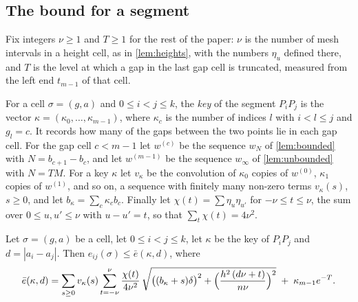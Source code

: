 \subsection{The bound for a segment}\label{sec:segment}

Fix integers $\nu\ge1$ and $T\ge1$ for the rest of the paper: $\nu$ is the number of mesh intervals in a height cell, as in \cref{lem:heights}, with the numbers $\eta_u$ defined there, and $T$ is the level at which a gap in the last gap cell is truncated, measured from the left end $t_{m-1}$ of that cell.

For a cell $\sigma=(g,a)$ and $0\le i<j\le k$, the \emph{key} of the segment $P_iP_j$ is the vector $\kappa=(\kappa_0,\dots,\kappa_{m-1})$, where $\kappa_c$ is the number of indices $l$ with $i<l\le j$ and $g_l=c$. It records how many of the gaps between the two points lie in each gap cell. For the gap cell $c<m-1$ let $w^{(c)}$ be the sequence $w_N$ of \cref{lem:bounded} with $N=b_{c+1}-b_c$, and let $w^{(m-1)}$ be the sequence $w_\infty$ of \cref{lem:unbounded} with $N=TM$. For a key $\kappa$ let $v_\kappa$ be the convolution of $\kappa_0$ copies of $w^{(0)}$, $\kappa_1$ copies of $w^{(1)}$, and so on, a sequence with finitely many non-zero terms $v_\kappa(s)$, $s\ge0$, and let $b_\kappa=\sum_c\kappa_cb_c$. Finally let $\chi(t)=\sum\eta_u\eta_{u'}$ for $-\nu\le t\le\nu$, the sum over $0\le u,u'\le\nu$ with $u-u'=t$, so that $\sum_t\chi(t)=4\nu^2$.

\begin{prop}\label{prop:segment}
Let $\sigma=(g,a)$ be a cell, let $0\le i<j\le k$, let $\kappa$ be the key of $P_iP_j$ and $d=|a_i-a_j|$. Then $e_{ij}(\sigma)\le\bar e(\kappa,d)$, where
\begin{equation}\label{eq:ebar}
\bar e(\kappa,d)=\sum_{s\ge0}v_\kappa(s)\sum_{t=-\nu}^{\nu}\frac{\chi(t)}{4\nu^2}\,
\sqrt{\bigl((b_\kappa+s)\delta\bigr)^2+\Bigl(\frac{h^2\,(d\nu+t)}{n\nu}\Bigr)^2}\;+\;\kappa_{m-1}e^{-T}.
\end{equation}
\end{prop}

